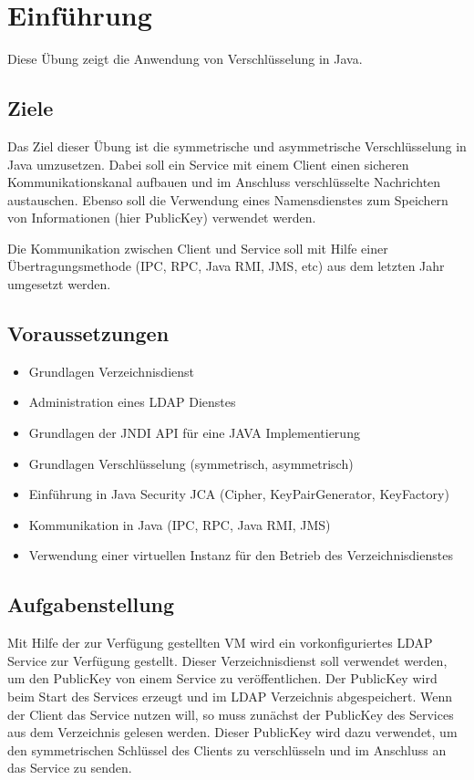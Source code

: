 
\section{Einführung}
Diese Übung zeigt die Anwendung von Verschlüsselung in Java.

\subsection{Ziele}
Das Ziel dieser Übung ist die symmetrische und asymmetrische Verschlüsselung in Java umzusetzen. Dabei soll ein Service mit einem Client einen sicheren Kommunikationskanal aufbauen und im Anschluss verschlüsselte Nachrichten austauschen. Ebenso soll die Verwendung eines Namensdienstes zum Speichern von Informationen (hier PublicKey) verwendet werden.

Die Kommunikation zwischen Client und Service soll mit Hilfe einer Übertragungsmethode (IPC, RPC, Java RMI, JMS, etc) aus dem letzten Jahr umgesetzt werden.

\subsection{Voraussetzungen}

\begin{itemize}
\item Grundlagen Verzeichnisdienst
\item Administration eines LDAP Dienstes
\item Grundlagen der JNDI API für eine JAVA Implementierung
\item Grundlagen Verschlüsselung (symmetrisch, asymmetrisch)
\item Einführung in Java Security JCA (Cipher, KeyPairGenerator, KeyFactory)
\item Kommunikation in Java (IPC, RPC, Java RMI, JMS)
\item Verwendung einer virtuellen Instanz für den Betrieb des Verzeichnisdienstes
\end{itemize}

\subsection{Aufgabenstellung}
Mit Hilfe der zur Verfügung gestellten VM wird ein vorkonfiguriertes LDAP Service zur Verfügung gestellt. Dieser Verzeichnisdienst soll verwendet werden, um den PublicKey von einem Service zu veröffentlichen. Der PublicKey wird beim Start des Services erzeugt und im LDAP Verzeichnis abgespeichert. Wenn der Client das Service nutzen will, so muss zunächst der PublicKey des Services aus dem Verzeichnis gelesen werden. Dieser PublicKey wird dazu verwendet, um den symmetrischen Schlüssel des Clients zu verschlüsseln und im Anschluss an das Service zu senden.

